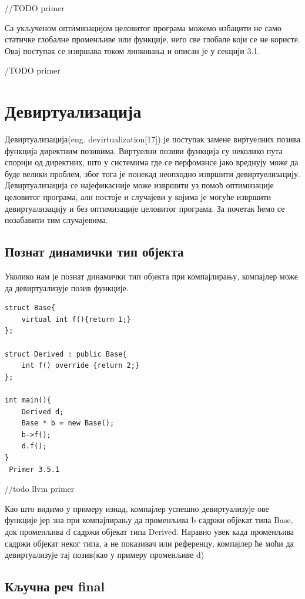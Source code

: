 \documentclass[12pt,oneside]{memoir}
\begin{document}
//TODO primer 

Са укљученом оптимизацијом целовитог програма можемо избацити не само статичке
глобалне променљиве или функције, него све глобале који се не користе.
Овај поступак се извршава током линковања и описан је у секцији  3.1.

/TODO primer

\section{Девиртуализација}
 Девиртуализација(eng. devirtualization[17]) је поступак замене виртуелних позива
 функција директним позивима.
 Виртуелни позиви функција су неколико пута спорији од директних, што у системима
 где се перфомансе јако вреднују може да буде велики проблем, због тога је понекад
 неопходно извршити девиртуелизацију.
 Девиртуализација се најефикасније може извршити уз помоћ оптимизације целовитог
 програма, али постоје и случајеви у којима је могуће извршити девиртуализацију 
 и без оптимизације целовитог програма.
 За почетак ћемо се позабавити тим случајевима.
 
 \subsection{Познат динамички тип објекта}
 Уколико нам је познат динамички тип објекта при компајлирању, компајлер може 
 да девиртуализује позив функције.
 
 \begin{lstlisting}
struct Base{
    virtual int f(){return 1;}
};

struct Derived : public Base{
    int f() override {return 2;}
};

int main(){
    Derived d;
    Base * b = new Base();
    b->f();
    d.f();  
}
 Primer 3.5.1
 \end{lstlisting}

 //todo llvm primer
 
 Као што видимо у примеру изнад, компајлер успешно девиртуализује ове функције
 јер зна при компајлирању да променљива b садржи објекат типа Base, док променљива
 d садржи објекат типа Derived.
 Наравно увек када променљива садржи објекат неког типа, а не показивач или референцу,
 компајлер ће моћи да девиртуализује тај позив(као у примеру променљиве d)
 
 \subsection{Кључна реч final}
 
\end{document}
